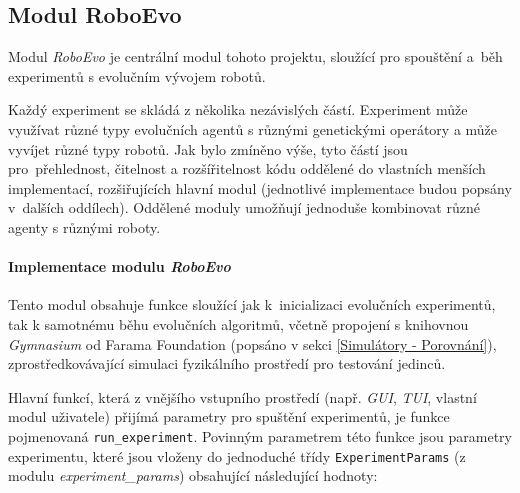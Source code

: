 \subsection{Modul RoboEvo} \label{imp:roboevo}
Modul \emph{RoboEvo} je centrální modul tohoto projektu, sloužící pro spouštění
a~běh experimentů s evolučním vývojem robotů. 

Každý experiment se skládá z několika nezávislých částí. Experiment může
využívat různé typy evolučních agentů s různými genetickými operátory a může
vyvíjet různé typy robotů. Jak bylo zmíněno výše, tyto částí jsou
pro~přehlednost, čitelnost a rozšířitelnost kódu oddělené do vlastních menších
implementací, rozšiřujících hlavní modul (jednotlivé implementace budou popsány
v~dalších oddílech). Oddělené moduly umožňují jednoduše kombinovat různé agenty
s různými roboty.

\paragraph{Implementace modulu \emph{RoboEvo}}
Tento modul obsahuje funkce sloužící jak k~inicializaci evolučních experimentů,
tak k samotnému běhu evolučních algoritmů, včetně propojení s knihovnou
\emph{Gymnasium} od Farama Foundation (popsáno v sekci \ref{Simulátory -
Porovnání}), zprostředkovávající simulaci fyzikálního prostředí pro testování
jedinců.

Hlavní funkcí, která z vnějšího vstupního prostředí (např. \emph{GUI},
\emph{TUI}, vlastní modul uživatele) přijímá parametry pro spuštění
experimentů, je funkce pojmenovaná \texttt{run\_experiment}. Povinným
parametrem této funkce jsou parametry experimentu, které jsou
vloženy do jednoduché třídy \texttt{ExperimentParams} (z modulu
\emph{experiment\_params}) obsahující následující hodnoty:

